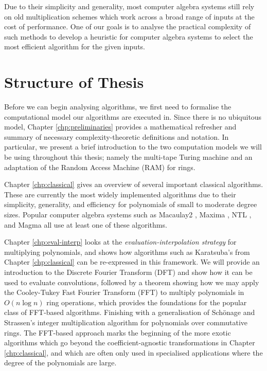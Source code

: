 Due to their simplicity and generality, most computer algebra systems still rely on old multiplication schemes which work across a broad range of inputs at the cost of performance. One of our goals is to analyse the practical complexity of such methods to develop a heuristic for computer algebra systems to select the most efficient algorithm for the given inputs.

\section{Structure of Thesis}
\label{sec:Structure-of-Thesis}

Before we can begin analysing algorithms, we first need to formalise the computational model our algorithms are executed in. Since there is no ubiquitous model, Chapter \ref{chp:preliminaries} provides a mathematical refresher and summary of necessary complexity-theoretic definitions and notation. In particular, we present a brief introduction to the two computation models we will be using throughout this thesis; namely the multi-tape Turing machine and an adaptation of the Random Access Machine (RAM) for rings.

Chapter \ref{chp:classical} gives an overview of several important classical algorithms. These are currently the most widely implemented algorithms due to their simplicity, generality, and efficiency for polynomials of small to moderate degree sizes. Popular computer algebra systems such as Macaulay2 \cite{macaulay2-polynomial}, Maxima \cite{maxima-karatsuba}, NTL \cite{ntl}, and Magma \cite{magma} all use at least one of these algorithms.

Chapter \ref{chp:eval-interp} looks at the \emph{evaluation-interpolation strategy} for multiplying polynomials, and shows how algorithms such as Karatsuba's from Chapter \ref{chp:classical} can be re-expressed in this framework. We will provide an introduction to the Discrete Fourier Transform (DFT) and show how it can be used to evaluate convolutions, followed by a theorem showing how we may apply the Cooley-Tukey Fast Fourier Transform (FFT) to multiply polynomials in $O(n \log n)$ ring operations, which provides the foundations for the popular class of FFT-based algorithms. Finishing with a generalisation of Sch\"{o}nage and Strassen's integer multiplication algorithm for polynomials over commutative rings. The FFT-based approach marks the beginning of the more exotic algorithms which go beyond the coefficient-agnostic transformations in Chapter \ref{chp:classical}, and which are often only used in specialised applications where the degree of the polynomials are large.

